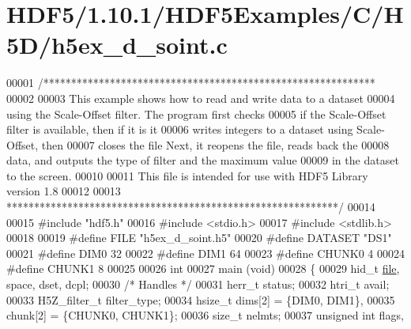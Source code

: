 \hypertarget{_h_d_f5_21_810_81_2_h_d_f5_examples_2_c_2_h5_d_2h5ex__d__soint_8c_source}{}\section{H\+D\+F5/1.10.1/\+H\+D\+F5\+Examples/\+C/\+H5\+D/h5ex\+\_\+d\+\_\+soint.c}
\label{_h_d_f5_21_810_81_2_h_d_f5_examples_2_c_2_h5_d_2h5ex__d__soint_8c_source}

\begin{DoxyCode}
00001 \textcolor{comment}{/************************************************************}
00002 \textcolor{comment}{}
00003 \textcolor{comment}{  This example shows how to read and write data to a dataset}
00004 \textcolor{comment}{  using the Scale-Offset filter.  The program first checks}
00005 \textcolor{comment}{  if the Scale-Offset filter is available, then if it is it}
00006 \textcolor{comment}{  writes integers to a dataset using Scale-Offset, then}
00007 \textcolor{comment}{  closes the file Next, it reopens the file, reads back the}
00008 \textcolor{comment}{  data, and outputs the type of filter and the maximum value}
00009 \textcolor{comment}{  in the dataset to the screen.}
00010 \textcolor{comment}{}
00011 \textcolor{comment}{  This file is intended for use with HDF5 Library version 1.8}
00012 \textcolor{comment}{}
00013 \textcolor{comment}{ ************************************************************/}
00014 
00015 \textcolor{preprocessor}{#include "hdf5.h"}
00016 \textcolor{preprocessor}{#include <stdio.h>}
00017 \textcolor{preprocessor}{#include <stdlib.h>}
00018 
00019 \textcolor{preprocessor}{#define FILE            "h5ex\_d\_soint.h5"}
00020 \textcolor{preprocessor}{#define DATASET         "DS1"}
00021 \textcolor{preprocessor}{#define DIM0            32}
00022 \textcolor{preprocessor}{#define DIM1            64}
00023 \textcolor{preprocessor}{#define CHUNK0          4}
00024 \textcolor{preprocessor}{#define CHUNK1          8}
00025 
00026 \textcolor{keywordtype}{int}
00027 main (\textcolor{keywordtype}{void})
00028 \{
00029     hid\_t           \hyperlink{structfile}{file}, space, dset, dcpl;
00030                                                 \textcolor{comment}{/* Handles */}
00031     herr\_t          status;
00032     htri\_t          avail;
00033     H5Z\_filter\_t    filter\_type;
00034     hsize\_t         dims[2] = \{DIM0, DIM1\},
00035                     chunk[2] = \{CHUNK0, CHUNK1\};
00036     \textcolor{keywordtype}{size\_t}          nelmts;
00037     \textcolor{keywordtype}{unsigned} \textcolor{keywordtype}{int}    flags,

\end{DoxyCode}
